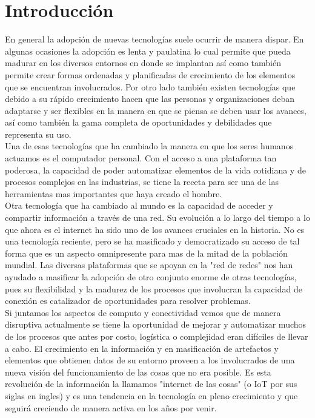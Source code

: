 

\chapter{Introducción}
En general la adopción de nuevas tecnologías suele ocurrir de manera dispar. En algunas ocasiones la adopción es lenta y paulatina lo cual permite que pueda madurar en los diversos entornos en donde se implantan así como también permite crear formas ordenadas y planificadas de crecimiento de los elementos que se encuentran involucrados. Por otro lado también existen tecnologías que debido a su rápido crecimiento hacen que las personas y organizaciones deban adaptarse y ser flexibles en la manera en que se piensa se deben usar los avances, así como también la gama completa de oportunidades y debilidades que representa su uso.\\ 

Una de esas tecnologías que ha cambiado la manera en que los seres humanos actuamos es el computador personal. Con el acceso a una plataforma tan poderosa, la capacidad de poder automatizar elementos de la vida cotidiana y de procesos complejos en las industrias, se tiene la receta para ser una de las herramientas mas importantes que haya creado el hombre. \\

Otra tecnología que ha cambiado al mundo es la capacidad de acceder y compartir información a través de una red. Su evolución a lo largo del tiempo a lo que ahora es el internet ha sido uno de los avances cruciales en la historia. No es una tecnología reciente, pero se ha masificado y democratizado su acceso de tal forma que es un aspecto omnipresente para mas de la mitad de la población mundial. Las diversas plataformas que se apoyan en la "red de redes" nos han ayudado a masificar la adopción de otro conjunto enorme de otras tecnologías, pues su flexibilidad y la madurez de los procesos que involucran la capacidad de conexión es catalizador de oportunidades para resolver problemas.\\

Si juntamos los aspectos de computo y conectividad vemos que de manera disruptiva actualmente se tiene la oportunidad de mejorar y automatizar muchos de los procesos que antes por costo, logística o complejidad eran difíciles de llevar a cabo. El crecimiento en la información y en masificación de artefactos y elementos que obtienen datos de su entorno proveen a los involucrados de una nueva visión del funcionamiento de las cosas que no era posible. Es esta revolución de la información la llamamos "internet de las cosas" (o IoT por sus siglas en ingles) y es una tendencia en la tecnología en pleno crecimiento y que seguirá creciendo de manera activa en los años por venir.\\ 

